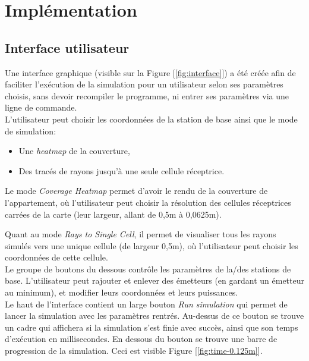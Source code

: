 \chapter{Implémentation}
\label{chapter-2}




\section{Interface utilisateur}
Une interface graphique (visible sur la Figure [\ref{fig:interface}]) a été créée afin de faciliter l'exécution de la simulation pour un utilisateur selon ses paramètres choisis, sans devoir recompiler le programme, ni entrer ses paramètres via une ligne de commande.\\

L'utilisateur peut choisir les coordonnées de la station de base ainsi que le mode de simulation:
\begin{itemize}
    \item Une \textit{heatmap} de la couverture,
    \item Des tracés de rayons jusqu'à une seule cellule réceptrice.
\end{itemize}

Le mode \textit{Coverage Heatmap} permet d'avoir le rendu de la couverture de l'appartement, où l'utilisateur peut choisir la résolution des cellules réceptrices carrées de la carte (leur largeur, allant de 0,5m à 0,0625m).

Quant au mode \textit{Rays to Single Cell}, il permet de visualiser tous les rayons simulés vers une unique cellule (de largeur 0,5m), où l'utilisateur peut choisir les coordonnées de cette cellule.\\

Le groupe de boutons du dessous contrôle les paramètres de la/des stations de base. L'utilisateur peut rajouter et enlever des émetteurs (en gardant un émetteur au minimum), et modifier leurs coordonnées et leurs puissances.\\

Le haut de l'interface contient un large bouton \textit{Run simulation} qui permet de lancer la simulation avec les paramètres rentrés. Au-dessus de ce bouton se trouve un cadre qui affichera si la simulation s'est finie avec succès, ainsi que son temps d'exécution en millisecondes. En dessous du bouton se trouve une barre de progression de la simulation. Ceci est visible Figure [\ref{fig:time-0.125m}].\\

